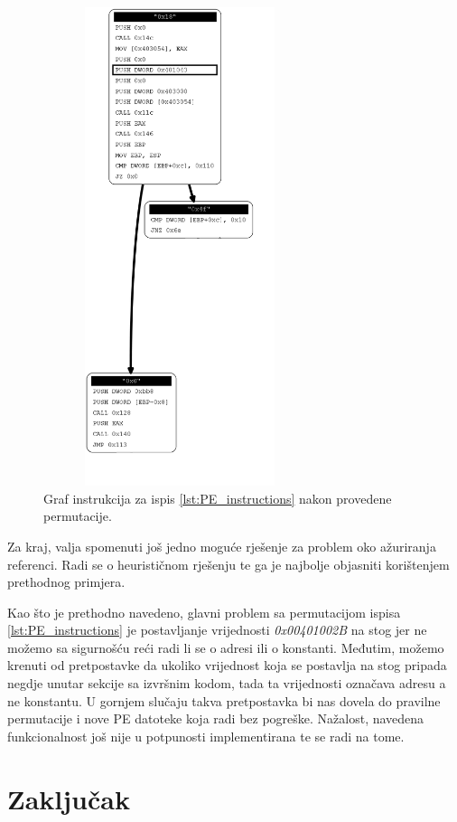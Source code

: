 \documentclass[times, utf8, diplomski, numeric]{fer}
\begin{document}
\begin{figure}[!htb]
\centering
\setlength\fboxsep{0pt}
\setlength\fboxrule{0.5pt}
\includegraphics[width=8cm, height=14cm]{slike/permutator_graph_permutated}
\caption{Graf instrukcija za ispis \ref{lst:PE_instructions} nakon provedene permutacije.}
\label{fig:control_flow_graph_permutated} 
\end{figure}

Za kraj, valja spomenuti još jedno
moguće rješenje za problem oko ažuriranja referenci. Radi se o
heurističnom rješenju te ga je najbolje objasniti korištenjem
prethodnog primjera.

Kao što je prethodno navedeno, glavni problem sa permutacijom
ispisa \ref{lst:PE_instructions} je postavljanje
vrijednosti \emph{0x00401002B} na stog jer ne možemo sa
sigurnošću reći radi li se o adresi ili o konstanti. Međutim,
možemo krenuti od pretpostavke da ukoliko vrijednost koja se
postavlja na stog pripada negdje unutar sekcije sa izvršnim
kodom, tada ta vrijednosti označava adresu a ne konstantu. U
gornjem slučaju takva pretpostavka bi nas dovela do pravilne
permutacije i nove PE datoteke koja radi bez pogreške. Nažalost,
navedena funkcionalnost još nije u potpunosti implementirana te
se radi na tome.


\chapter{Zaključak}
\end{document}
